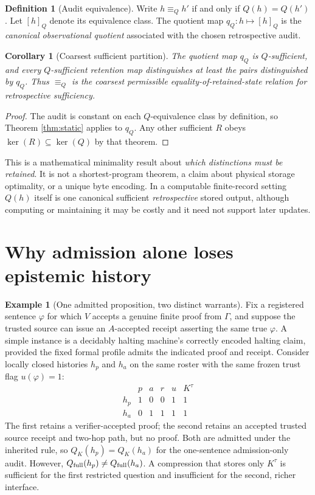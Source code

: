 \documentclass[11pt,letterpaper]{article}
\newtheorem{corollary}[theorem]{Corollary}
\theoremstyle{definition}
\newtheorem{definition}[theorem]{Definition}
\newtheorem{example}[theorem]{Example}
\begin{document}
\begin{definition}[Audit equivalence]
Write $h\equiv_Q h'$ if and only if $Q(h)=Q(h')$. Let $[h]_Q$ denote its equivalence class. The quotient map $q_Q:h\mapsto[h]_Q$ is the \emph{canonical observational quotient} associated with the chosen retrospective audit.
\end{definition}

\begin{corollary}[Coarsest sufficient partition]\label{cor:quotient}
The quotient map $q_Q$ is $Q$-sufficient, and every $Q$-sufficient retention map distinguishes at least the pairs distinguished by $q_Q$. Thus $\equiv_Q$ is the coarsest permissible equality-of-retained-state relation for retrospective sufficiency.
\end{corollary}
\begin{proof}
The audit is constant on each $Q$-equivalence class by definition, so Theorem \ref{thm:static} applies to $q_Q$. Any other sufficient $R$ obeys $\ker(R)\subseteq\ker(Q)$ by that theorem.
\end{proof}

This is a mathematical minimality result about \emph{which distinctions must be retained}. It is not a shortest-program theorem, a claim about physical storage optimality, or a unique byte encoding. In a computable finite-record setting $Q(h)$ itself is one canonical sufficient \emph{retrospective} stored output, although computing or maintaining it may be costly and it need not support later updates.

\section{Why admission alone loses epistemic history}
\begin{example}[One admitted proposition, two distinct warrants]\label{ex:proof-vs-att}
Fix a registered sentence $\varphi$ for which $V$ accepts a genuine finite proof from $\Gamma$, and suppose the trusted source can issue an $A$-accepted receipt asserting the same true $\varphi$. A simple instance is a decidably halting machine's correctly encoded halting claim, provided the fixed formal profile admits the indicated proof and receipt. Consider locally closed histories $h_p$ and $h_a$ on the same roster with the same frozen trust flag $u(\varphi)=1$:
\[
\begin{array}{c|cccc|c}
& p&a&r&u&K^\tau\\\hline
h_p&1&0&0&1&1\\
h_a&0&1&1&1&1
\end{array}
\]
The first retains a verifier-accepted proof; the second retains an accepted trusted source receipt and two-hop path, but no proof. Both are admitted under the inherited rule, so $Q_K(h_p)=Q_K(h_a)$ for the one-sentence admission-only audit. However, $Q_{\rm full}(h_p)\ne Q_{\rm full}(h_a)$. A compression that stores only $K^\tau$ is sufficient for the first restricted question and insufficient for the second, richer interface.
\end{example}
\end{document}
